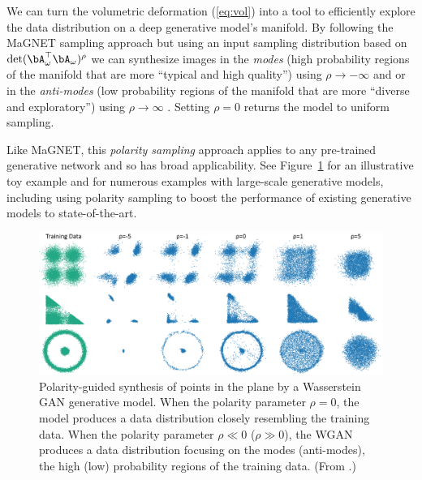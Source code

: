 \documentclass{notices}
\begin{document}
We can turn the volumetric deformation (\ref{eq:vol}) into a tool to efficiently explore the data distribution on a deep generative model's manifold.
By following the MaGNET sampling approach but using an input sampling distribution based on 
$\det(\bA_{\omega}^\top \bA_{\omega})^\rho$ we can synthesize images in the {\em modes} (high probability regions of the manifold 
that are more ``typical and high quality'') using ${\rho} \to -\infty$ and or in the {\em anti-modes} (low probability regions of the manifold that are more ``diverse and exploratory'') using ${\rho} \to \infty$ \cite{humayun2022polarity}. 
Setting $\rho=0$ returns the model to uniform sampling.


Like MaGNET, this {\em polarity sampling} approach applies to any pre-trained generative network and so has broad applicability.
See Figure~\ref{fig:polarity} for an illustrative toy example and \cite{humayun2022polarity} for numerous examples with large-scale generative models, including using polarity sampling to boost the performance of existing generative models to state-of-the-art.


\begin{figure}[h]
    \centering  
\includegraphics[width=1\linewidth]{Figs/2d_examples.png}
\vspace*{-5mm}
    \caption{\small
    Polarity-guided synthesis of points in the plane by a Wasserstein GAN generative model.
    When the polarity parameter $\rho=0$, the model produces a data distribution closely resembling the training data.
    When the polarity parameter $\rho\ll 0$ ($\rho\gg 0$), the WGAN produces a data distribution focusing on the modes (anti-modes), the high (low) probability regions of the training data.
    (From \cite{humayun2022polarity}.)}
    \label{fig:polarity}
\end{figure}
\end{document}
